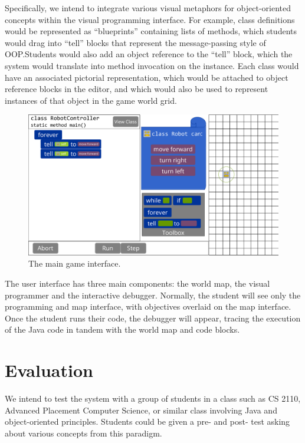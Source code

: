 \documentclass[12pt,notitlepage]{article}
\begin{document}
Specifically, we intend to integrate various visual metaphors for
object-oriented concepts within the visual programming interface. For
example, class definitions would be represented as ``blueprints''
containing lists of methods, which students would drag into ``tell''
blocks that represent the message-passing style of OOP.\@ Students
would also add an object reference to the ``tell'' block, which the
system would translate into method invocation on the instance. Each
class would have an associated pictorial representation, which would
be attached to object reference blocks in the editor, and which would
also be used to represent instances of that object in the game world
grid.

\begin{figure}[h]
  \centering
  \includegraphics[width=\textwidth]{mockup.pdf}
  \caption{The main game interface.}
\end{figure}
The user interface has three main components: the world map, the
visual programmer and the interactive debugger. Normally, the student
will see only the programming and map interface, with objectives
overlaid on the map interface. Once the student runs their code, the
debugger will appear, tracing the execution of the Java code in tandem
with the world map and code blocks.

\section{Evaluation}

We intend to test the system with a group of students in a class such
as CS 2110, Advanced Placement Computer Science, or similar class
involving Java and object-oriented principles. Students could be given
a pre- and post- test asking about various concepts from this paradigm.
\end{document}

